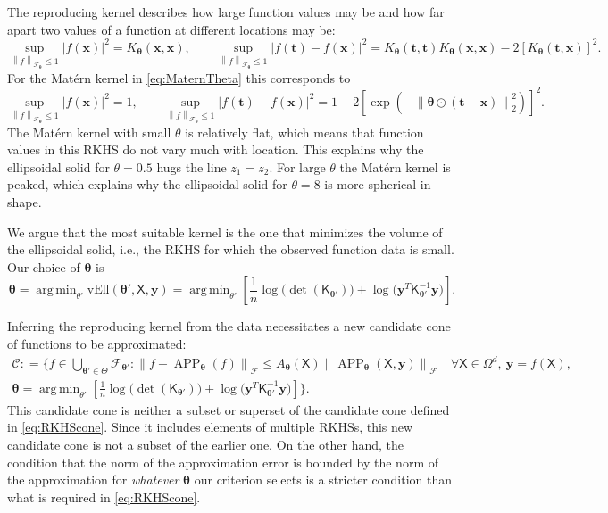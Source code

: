 \documentclass[]{mcom-l}
\theoremstyle{theorem}
\theoremstyle{remark}
\newcommand{\vEll}{\text{vEll}}
\DeclareMathOperator*{\argmin}{arg\,min}
\DeclareMathOperator{\APP}{APP}
\newcommand{\mK}{\mathsf{K}}
\newcommand{\mX}{\mathsf{X}}
\newcommand{\bx}{{\boldsymbol{x}}}
\newcommand{\by}{{\boldsymbol{y}}}
\newcommand{\bt}{{\boldsymbol{t}}}
\newcommand{\btheta}{{\boldsymbol{\theta}}}
\newcommand{\calc}{{\mathcal{C}}}
\newcommand{\calf}{{\mathcal{F}}}
\def\abs#1{\ensuremath{\left \lvert #1 \right \rvert}}
\newcommand{\norm}[2][{}]{\ensuremath{\left \lVert #2 \right \rVert}_{#1}}
\newcommand{\bignorm}[2][{}]{\ensuremath{\bigl \lVert #2 \bigr \rVert}_{#1}}
\begin{document}
The reproducing kernel describes how large function values may be and how far apart two values of a function at different locations may be:
\begin{equation} \label{eq:diff_f}
\sup_{\norm[\calf_{\btheta}]{f} \le 1} \abs{f(\bx)}^2 = K_\btheta(\bx,\bx), \qquad    \sup_{\norm[\calf_{\btheta}]{f} \le 1} \abs{f(\bt) - f(\bx)}^2 = K_{\btheta}(\bt,\bt) K_{\btheta}(\bx,\bx) - 2 [K_{\btheta}(\bt,\bx)]^2.
\end{equation}
For the Mat\'ern kernel in \eqref{eq:MaternTheta} this corresponds to 
\begin{equation} \label{eq:diff_f_Matern}
\sup_{\norm[\calf_{\btheta}]{f} \le 1} \abs{f(\bx)}^2 = 1, \qquad 
\sup_{\norm[\calf_{\btheta}]{f} \le 1} \abs{f(\bt) - f(\bx)}^2 = 1 - 2 [\exp(-\norm[2]{\btheta \odot (\bt-\bx)}^2)]^2.
\end{equation}
The Mat\'ern kernel with small $\theta$ is relatively flat, which means that function values in this RKHS do not vary much with location.  This explains why the ellipsoidal solid for $\theta = 0.5$ hugs the line $z_1 = z_2$.  For large $\theta$ the Mat\'ern kernel is peaked, which explains why the ellipsoidal solid for $\theta = 8$ is more spherical in shape.

We argue that the most suitable kernel is the one that minimizes the volume of the ellipsoidal solid, i.e., the RKHS for which the observed function data is small.   Our choice of $\btheta$ is
\begin{equation} \label{eq:thetEB}
\btheta  =  \argmin_{\theta'}  \vEll(\btheta' ,\mX,\by) 
 = \argmin_{\theta'}  \left[\frac 1n \log \bigl( \det(\mK_{\btheta'}) \bigr) + \log \bigl ( \by^T \mK_{\btheta'}^{-1} \by \bigr)\right].
\end{equation}

Inferring the reproducing kernel from the data necessitates a new candidate cone of functions to be approximated:
\begin{multline} \label{eq:RKHSconeTheta}
\calc : = \biggl \{f \in \bigcup_{\btheta' \in \Theta} \calf_{\btheta'} : \bignorm[\calf]{f - \APP_{\btheta}(f)} \le A_{\btheta}(\mX) \bignorm[\calf]{\APP_{\btheta}(\mX,\by)} \quad \forall \mX \in \Omega^d, \ \by = f(\mX),  \\
 \btheta = \argmin_{\theta'}  \left[\frac 1n \log \bigl( \det(\mK_{\btheta'}) \bigr) + \log \bigl ( \by^T \mK_{\btheta'}^{-1} \by \bigr)\right] \biggr \}.
\end{multline}
This candidate cone is neither a subset or superset of the candidate cone defined in \eqref{eq:RKHScone}.  Since it includes elements of multiple RKHSs, this new candidate cone is not a subset of the earlier one.  On the other hand, the condition that  the norm of the approximation error  is bounded by the norm of the approximation for \emph{whatever} $\btheta$ our criterion selects is a stricter condition than what is required in \eqref{eq:RKHScone}. 
\end{document}
